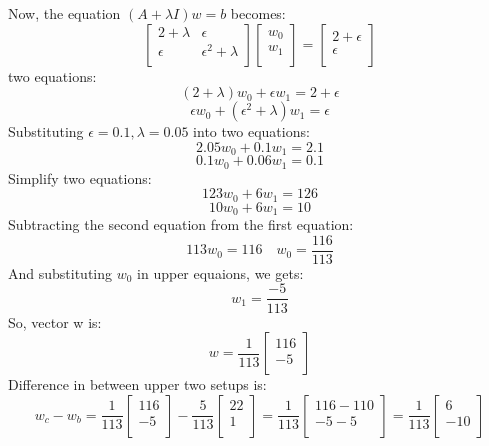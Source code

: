 \documentclass{article}
\begin{document}
Now, the equation $(A+\lambda I)w = b$ becomes:
\[
\begin{bmatrix}
    2+\lambda & \epsilon \\
    \epsilon & \epsilon^{2}+\lambda \\
\end{bmatrix}
\begin{bmatrix}
    w_{0} \\
    w_{1} \\
\end{bmatrix}
=
\begin{bmatrix}
    2 + \epsilon \\
    \epsilon \\
\end{bmatrix}
\]
two equations:
\[
    (2+\lambda)w_{0} + \epsilon w_{1} = 2 + \epsilon
\]
\[
    \epsilon w_{0} + (\epsilon^{2}+\lambda) w_{1} = \epsilon
\]
Substituting $\epsilon = 0.1, \lambda = 0.05$ into two equations:
\[
    2.05w_{0} + 0.1w_{1} = 2.1
\]
\[
    0.1w_{0} + 0.06w_{1} = 0.1
\]
Simplify two equations:
\[
    123w_{0} + 6w_{1} = 126
\]
\[
    10w_{0} + 6w_{1} = 10
\]
Subtracting the second equation from the first equation:
\[
    113w_{0} = 116
    \hspace{1em}
    w_{0} = \frac{116}{113}
\]
And substituting $w_{0}$ in upper equaions, we gets:
\[
    w_{1}=\frac{-5}{113}
\]
So, vector w is:
\[
    w = \frac{1}{113}
    \begin{bmatrix}
        116 \\
        -5 \\
    \end{bmatrix}
\]
Difference in between upper two setups is:
\[
    w_{c} - w_{b} = \frac{1}{113}
    \begin{bmatrix}
        116 \\
        -5 \\
    \end{bmatrix}
    -
    \frac{5}{113}
    \begin{bmatrix}
        22 \\
        1 \\
    \end{bmatrix}
    =
    \frac{1}{113}
    \begin{bmatrix}
        116 - 110\\
        -5 -5\\
    \end{bmatrix}
    =
    \frac{1}{113}
    \begin{bmatrix}
        6 \\
        -10 \\
    \end{bmatrix}
\]
\end{document}

